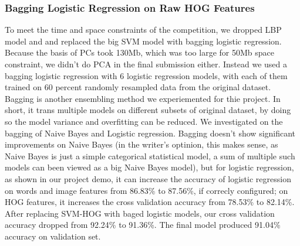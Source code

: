 \subsubsection{Bagging Logistic Regression on Raw HOG Features}
To meet the time and space constraints of the competition, we dropped LBP model and and replaced the big SVM model with bagging logistic regression. Because the basis of PCs took 130Mb, which was too large for 50Mb space constraint, we didn't do PCA in the final submission either. Instead we used a bagging logistic regression with 6 logistic regression  models, with each of them trained on 60 percent randomly resampled data from the original dataset. Bagging is another ensembling method we experiemented for thie project. In short, it trans multiple models on different subsets of original dataset, by doing so the model variance and overfitting can be reduced. We investigated on the bagging of Naive Bayes and Logistic regression. Bagging doesn't show significant improvements on Naive Bayes (in the writer's optinion, this makes sense, as Naive Bayes is just a simple categorical statistical model, a sum of multiple such models can been viewed as a big Naive Bayes model), but for logistic regression, as shown in our project demo, it can increase the accuracy of logistic regression on words and image features from 86.83\% to 87.56\%, if correcly configured; on HOG features, it increases the cross validation accuracy from 78.53\% to 82.14\%.  After replacing SVM-HOG with baged logistic models, our cross validation accuracy dropped from 92.24\% to 91.36\%. The final model produced 91.04\% accuracy on validation set.

